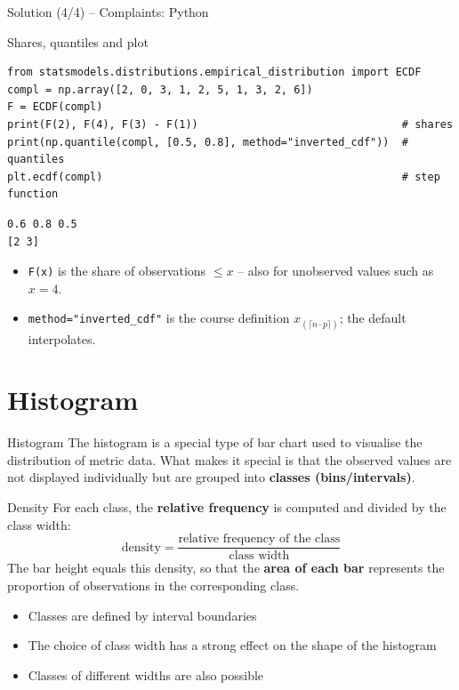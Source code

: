 \documentclass[aspectratio=169,11pt]{beamer}
\begin{document}
\begin{frame}[fragile]{Solution (4/4) -- Complaints: Python}
  \begin{block}{Shares, quantiles and plot}
    \begin{lstlisting}
from statsmodels.distributions.empirical_distribution import ECDF
compl = np.array([2, 0, 3, 1, 2, 5, 1, 3, 2, 6])
F = ECDF(compl)
print(F(2), F(4), F(3) - F(1))                                # shares
print(np.quantile(compl, [0.5, 0.8], method="inverted_cdf"))  # quantiles
plt.ecdf(compl)                                               # step function
    \end{lstlisting}
    \begin{lstlisting}[style=Pyout]
0.6 0.8 0.5
[2 3]
    \end{lstlisting}
  \end{block}
  \begin{itemize}
    \item \texttt{F(x)} is the share of observations $\le x$ -- also for
          unobserved values such as $x = 4$.
    \item \texttt{method="inverted\_cdf"} is the course definition
          $x_{(\lceil n\cdot p \rceil)}$; the default interpolates.
  \end{itemize}
\end{frame}

\section{Histogram}
\begin{frame}{Histogram}
  \small
  The histogram is a special type of bar chart used to visualise the distribution of metric data. What makes it special is that the observed values are not displayed individually but are grouped into \textbf{classes (bins/intervals)}.

  \begin{block}{Density}
    For each class, the \textbf{relative frequency} is computed and divided by the class width:
    \[ \text{density} = \frac{\text{relative frequency of the class}}{\text{class width}} \]
    The bar height equals this density, so that the \textbf{area of each bar} represents the proportion of observations in the corresponding class.
  \end{block}

  \begin{itemize}
    \item Classes are defined by interval boundaries
    \item The choice of class width has a strong effect on the shape of the histogram
    \item Classes of different widths are also possible
  \end{itemize}
\end{frame}
\end{document}
